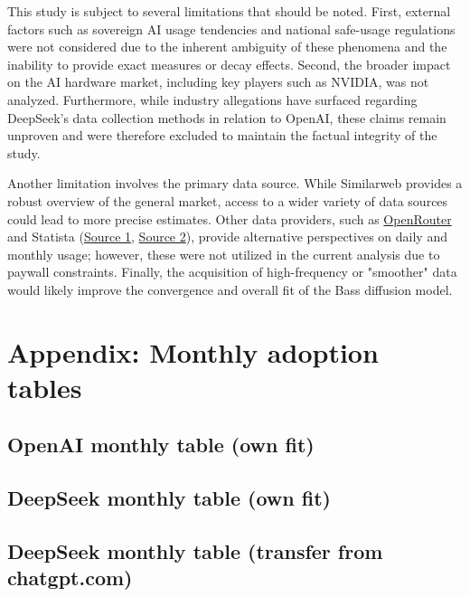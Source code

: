 \documentclass{article}
\begin{document}
This study is subject to several limitations that should be noted. First, external factors such as sovereign AI usage tendencies and national safe-usage regulations were not considered due to the inherent ambiguity of these phenomena and the inability to provide exact measures or decay effects. Second, the broader impact on the AI hardware market, including key players such as NVIDIA, was not analyzed. Furthermore, while industry allegations have surfaced regarding DeepSeek's data collection methods in relation to OpenAI, these claims remain unproven and were therefore excluded to maintain the factual integrity of the study.

Another limitation involves the primary data source. While Similarweb provides a robust overview of the general market, access to a wider variety of data sources could lead to more precise estimates. Other data providers, such as \href{https://openrouter.ai/deepseek/deepseek-r1:free}{OpenRouter} and Statista (\href{https://www.statista.com/statistics/1561128/deepseek-daily-active-users/?srsltid=AfmBOoropm3jOgkgdZMGQ9fweLhZLJK4jN3-YnUfzRHfzdQ_QObnmRie}{Source 1}, \href{https://www.statista.com/statistics/1659718/global-monthly-chatgpt-users/?srsltid=AfmBOor9vFsVYNFJTC6oLSHMlqm6DtZzO4DCZNnO8TtU1KTyhnIJoj2l}{Source 2}), provide alternative perspectives on daily and monthly usage; however, these were not utilized in the current analysis due to paywall constraints. Finally, the acquisition of high-frequency or "smoother" data would likely improve the convergence and overall fit of the Bass diffusion model.

\appendix
\section{Appendix: Monthly adoption tables}
\label{app:tables}

\subsection{OpenAI monthly table (own fit)}
\scriptsize

\normalsize

\subsection{DeepSeek monthly table (own fit)}
\scriptsize

\normalsize

\subsection{DeepSeek monthly table (transfer from chatgpt.com)}
\scriptsize

\normalsize

\newpage
\end{document}

